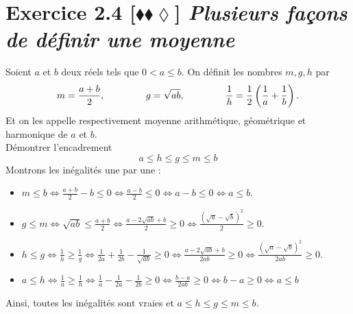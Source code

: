 \documentclass[10pt]{article}
\begin{document}
\section*{Exercice 2.4 [$\blacklozenge\blacklozenge\lozenge$] \emph{Plusieurs façons de définir une moyenne}}
\begin{tcolorbox}[enhanced, width=6in, center, size=fbox, fontupper=\large, drop shadow southwest]
    Soient $a$ et $b$ deux réels tels que $0 < a \leq b$. On définit les nombres $m,g,h$ par
    \begin{equation*}
        m=\frac{a+b}{2}, \hspace{1.5cm} g=\sqrt{ab}, \hspace{1.5cm} \frac{1}{h}=\frac{1}{2}\left(\frac{1}{a}+\frac{1}{b}\right).
    \end{equation*}
    Et on les appelle respectivement moyenne arithmétique, géométrique et harmonique de $a$ et $b$.\\
    Démontrer l'encadrement
    \begin{equation*}
        a \leq h \leq g \leq m \leq b
    \end{equation*}
    Montrons les inégalités une par une :
    \begin{itemize}
        \item $m \leq b \iff \frac{a+b}{2}-b\leq 0 \iff \frac{a-b}{2} \leq 0 \iff a - b \leq 0 \iff a \leq b$.
        \item $g \leq m \iff \sqrt{ab} \leq \frac{a+b}{2} \iff \frac{a - 2\sqrt{ab} + b}{2} \geq 0 \iff \frac{(\sqrt{a}-\sqrt{b})^2}{2} \geq 0$.
        \item $h \leq g \iff \frac{1}{h} \geq \frac{1}{g} \iff \frac{1}{2a}+\frac{1}{2b}-\frac{1}{\sqrt{ab}} \geq 0 \iff \frac{a-2\sqrt{ab}+b}{2ab} \geq 0 \iff \frac{(\sqrt{a}-\sqrt{b})^2}{2ab}\geq0$.
        \item $a \leq h \iff \frac{1}{a} \geq \frac{1}{h} \iff \frac{1}{a}-\frac{1}{2a}-\frac{1}{2b}\geq 0 \iff \frac{b-a}{2ab}\geq0 \iff b-a\geq 0 \iff a \leq b$
    \end{itemize}
    Ainsi, toutes les inégalités sont vraies et $a\leq h \leq g \leq m \leq b$.
\end{tcolorbox}

\end{document}
